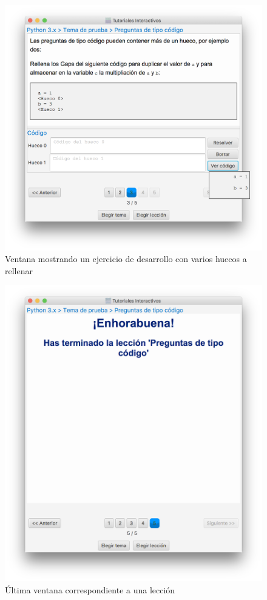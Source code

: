 \documentclass[]{article}
\begin{document}
%
\begin{figure}[tbp]
\begin{center}
\includegraphics[scale=0.35,trim={50px 70px 10px 30px}, clip]{l_7.png}
\end{center}
\caption{Ventana mostrando un ejercicio de desarrollo con varios huecos a rellenar\label{fig:l_7}}
\end{figure}
%

%
\begin{figure}[tbp]
\begin{center}
\includegraphics[scale=0.35,trim={50px 70px 50px 30px}, clip]{l_8.png}
\end{center}
\caption{Última ventana correspondiente a una lección\label{fig:l_8}}
\end{figure}
%
\end{document}
